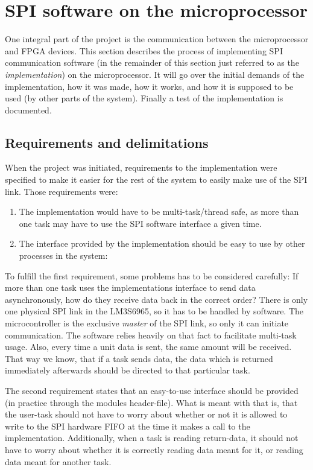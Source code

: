 \section{SPI software on the microprocessor}
One integral part of the project is the communication between the microprocessor and FPGA devices. This section describes the process of implementing SPI communication software (in the remainder of this section just referred to as the \textit{implementation}) on the microprocessor. It will go over the initial demands of the implementation, how it was made, how it works, and how it is supposed to be used (by other parts of the system). Finally a test of the implementation is documented.

\subsection{Requirements and delimitations}\label{sec:spi_software_reqs}
When the project was initiated, requirements to the implementation were specified to make it easier for the rest of the system to easily make use of the SPI link. Those requirements were:
\begin{enumerate}
  \item The implementation would have to be multi-task/thread safe, as more than one task may have to use the SPI software interface a given time.
  \item The interface provided by the implementation should be easy to use by other processes in the system:
\end{enumerate}

To fulfill the first requirement, some problems has to be considered carefully: If more than one task uses the implementations interface to send data asynchronously, how do they receive data back in the correct order? There is only one physical SPI link in the LM3S6965, so it has to be handled by software.
The microcontroller is the exclusive \textit{master} of the SPI link, so only it can initiate communication. The software relies heavily on that fact to facilitate multi-task usage. Also, every time a unit data is sent, the same amount will be received. That way we know, that if a task sends data, the data which is returned immediately afterwards should be directed to that particular task.

The second requirement states that an easy-to-use interface should be provided (in practice through the modules header-file). What is meant with that is, that the user-task should not have to worry about whether or not it is allowed to write to the SPI hardware FIFO at the time it makes a call to the implementation. Additionally, when a task is reading return-data, it should not have to worry about whether it is correctly reading data meant for it, or reading data meant for another task.

